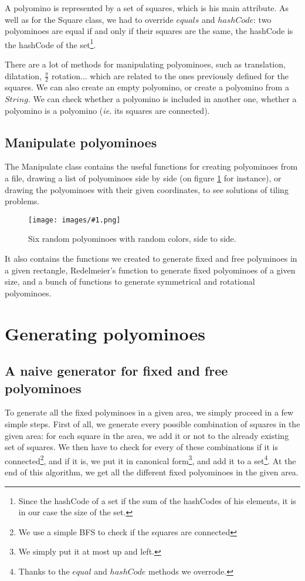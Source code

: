 \documentclass[12pt]{article}
\newcommand{\foreign}{\textit}
\newcommand{\illustration}[2]{
	\begin{figure}[]
	\begin{center}
	\texttt{[image: images/\#1.png]}
	\caption{#2}
	\label{fig:#1}
	\end{center}
	\end{figure}
}
\begin{document}
A polyomino is represented by a set of squares, which is his main attribute.
As well as for the Square class, we had to override $equals$ and $hashCode$: two polyominoes are equal if and only if their squares are the same, the hashCode is the hashCode of the set\footnote{Since the hashCode of a set if the sum of the hashCodes of his elements, it is in our case the size of the set.}.

There are a lot of methods for manipulating polyominoes, such as translation, dilatation, $\frac{\pi}{2}$ rotation... which are related to the ones previously defined for the squares.
We can also create an empty polyomino, or create a polyomino from a $String$.
We can check whether a polyomino is included in another one, whether a polyomino is a polyomino (\foreign{ie.} its squares are connected).

\subsection{Manipulate polyominoes}

The Manipulate class contains the useful functions for creating polyominoes from a file, drawing a list of polyominoes side by side (on figure \ref{fig:INF421} for instance), or drawing the polyominoes with their given coordinates, to see solutions of tiling problems.

\illustration{INF421}{Six random polyominoes with random colors, side to side.}

It also contains the functions we created to generate fixed and free polyminoes in a given rectangle, Redelmeier's function to generate fixed polyominoes of a given size, and a bunch of functions to generate symmetrical and rotational polyominoes.



\section{Generating polyominoes}

\subsection{A naive generator for fixed and free polyominoes}

To generate all the fixed polyminoes in a given area, we simply proceed in a few simple steps.
First of all, we generate every possible combination of squares in the given area: for each square in the area, we add it or not to the already existing set of squares.
We then have to check for every of these combinations if it is connected\footnote{We use a simple BFS to check if the squares are connected}, and if it is, we put it in canonical form\footnote{We simply put it at most up and left.}, and add it to a set\footnote{Thanks to the $equal$ and $hashCode$ methods we overrode.}.
At the end of this algorithm, we get all the different fixed polyominoes in the given area.
\end{document}
